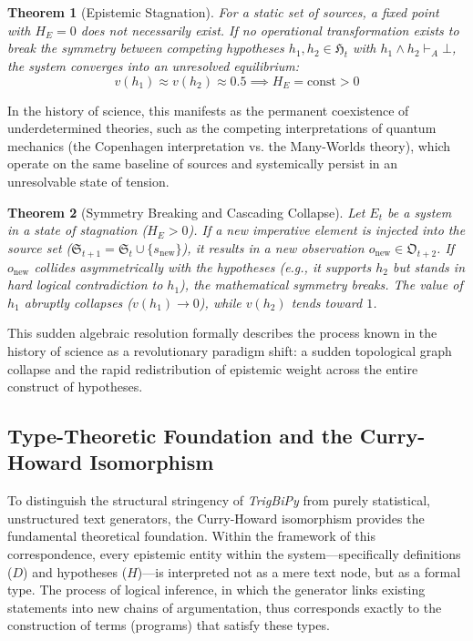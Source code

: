 \documentclass[11pt, a4paper]{article}
\newtheorem{theorem}{Theorem}
\begin{document}
	\begin{theorem}[Epistemic Stagnation]
		For a static set of sources, a fixed point with $H_E = 0$ does not necessarily exist. If no operational transformation exists to break the symmetry between competing hypotheses $h_1, h_2 \in \mathfrak{H}_t$ with $h_1 \land h_2 \vdash_A \bot$, the system converges into an unresolved equilibrium:
		\[
		v(h_1) \approx v(h_2) \approx 0.5 \implies H_E = \text{const} > 0
		\]
	\end{theorem}
	
	In the history of science, this manifests as the permanent coexistence of underdetermined theories, such as the competing interpretations of quantum mechanics (the Copenhagen interpretation vs. the Many-Worlds theory), which operate on the same baseline of sources and systemically persist in an unresolvable state of tension.
	
	\begin{theorem}[Symmetry Breaking and Cascading Collapse]
		Let $E_t$ be a system in a state of stagnation ($H_E > 0$). If a new imperative element is injected into the source set ($\mathfrak{S}_{t+1} = \mathfrak{S}_t \cup \{s_{\text{new}}\}$), it results in a new observation $o_{\text{new}} \in \mathfrak{O}_{t+2}$. If $o_{\text{new}}$ collides asymmetrically with the hypotheses (e.g., it supports $h_2$ but stands in hard logical contradiction to $h_1$), the mathematical symmetry breaks. The value of $h_1$ abruptly collapses ($v(h_1) \to 0$), while $v(h_2)$ tends toward $1$.
	\end{theorem}
	
	This sudden algebraic resolution formally describes the process known in the history of science as a revolutionary paradigm shift: a sudden topological graph collapse and the rapid redistribution of epistemic weight across the entire construct of hypotheses.
	
	\subsection{Type-Theoretic Foundation and the Curry-Howard Isomorphism}
	
	To distinguish the structural stringency of \emph{TrigBiPy} from purely statistical, unstructured text generators, the Curry-Howard isomorphism provides the fundamental theoretical foundation. Within the framework of this correspondence, every epistemic entity within the system—specifically definitions ($D$) and hypotheses ($H$)—is interpreted not as a mere text node, but as a formal type. The process of logical inference, in which the generator links existing statements into new chains of argumentation, thus corresponds exactly to the construction of terms (programs) that satisfy these types.
	
\end{document}
